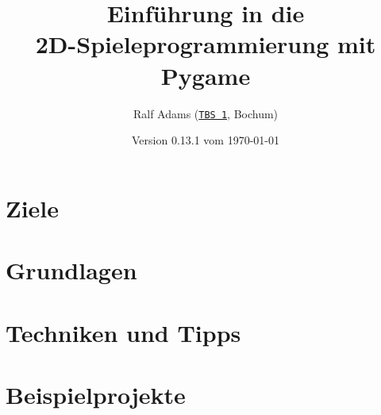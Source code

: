 \documentclass[a4paper,12pt,twoside]{scrreprt}
\begin{document}
  \title{Einführung in die\\2D-Spieleprogrammierung mit Pygame}
  \author{Ralf Adams (\href{https://www.tbs1.de/}{\nolinkurl{TBS 1}}, Bochum)}
  \date{Version 0.13.1 vom \today}
  \maketitle
  \tableofcontents

\setlength{\parindent}{0.0em}
\setlength{\parskip}{1.0ex plus0.5ex minus0.5ex}
\setlength{\itemsep}{-0.3ex plus0.2ex}


\chapter{Ziele}
\chapter{Grundlagen}\label{secGrundlagen}













%

\chapter{Techniken und Tipps}


%
%
%
\chapter{Beispielprojekte}




\listoffigures

\printglossaries
\printindex
{}
\end{document}
